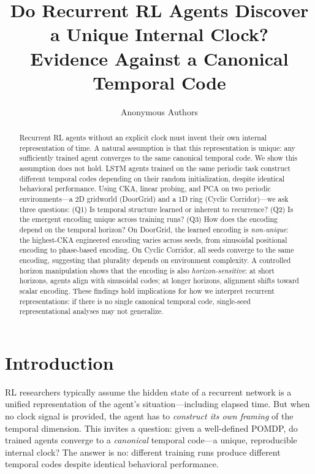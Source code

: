 \documentclass{article}
\title{Do Recurrent RL Agents Discover a Unique Internal Clock?\\Evidence Against a Canonical Temporal Code}
\author{Anonymous Authors}
\begin{document}
\makeCover
\maketitle

\begin{abstract}
Recurrent RL agents without an explicit clock must invent their own internal representation of time.
A natural assumption is that this representation is unique: any sufficiently trained agent converges to the same canonical temporal code.
We show this assumption does not hold.
LSTM agents trained on the same periodic task construct different temporal codes depending on their random initialization, despite identical behavioral performance.
Using CKA, linear probing, and PCA on two periodic environments---a 2D gridworld (DoorGrid) and a 1D ring (Cyclic Corridor)---we ask three questions: (Q1) Is temporal structure learned or inherent to recurrence?
(Q2) Is the emergent encoding unique across training runs?
(Q3) How does the encoding depend on the temporal horizon?
On DoorGrid, the learned encoding is \emph{non-unique}: the highest-CKA engineered encoding varies across seeds, from sinusoidal positional encoding to phase-based encoding.
On Cyclic Corridor, all seeds converge to the same encoding, suggesting that plurality depends on environment complexity.
A controlled horizon manipulation shows that the encoding is also \emph{horizon-sensitive}: at short horizons, agents align with sinusoidal codes; at longer horizons, alignment shifts toward scalar encoding.
These findings hold implications for how we interpret recurrent representations: if there is no single canonical temporal code, single-seed representational analyses may not generalize.
\end{abstract}

\section{Introduction}

RL researchers typically assume the hidden state of a recurrent network is a unified representation of the agent's situation---including elapsed time.
But when no clock signal is provided, the agent has to \emph{construct its own framing} of the temporal dimension.
This invites a question: given a well-defined POMDP, do trained agents converge to a \emph{canonical} temporal code---a unique, reproducible internal clock?
The answer is no: different training runs produce different temporal codes despite identical behavioral performance.
\end{document}
